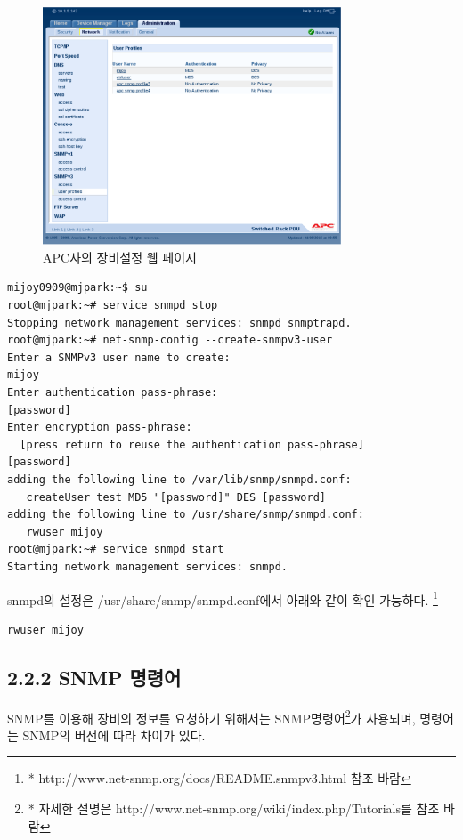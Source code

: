 \documentclass[11pt
  , a4paper
  , article
  , oneside
]{memoir}
\begin{document}
\begin{figure}[h]
  \centering
  \includegraphics[width=0.79\textwidth]{./images/apcv3.eps}
  \caption{APC사의 장비설정 웹 페이지}
  \label{fig:apc_v3}   
\end{figure}




\begin{lstlisting}[style=termstyle]
mijoy0909@mjpark:~$ su                                     
root@mjpark:~# service snmpd stop
Stopping network management services: snmpd snmptrapd.
root@mjpark:~# net-snmp-config --create-snmpv3-user
Enter a SNMPv3 user name to create: 
mijoy
Enter authentication pass-phrase: 
[password]
Enter encryption pass-phrase: 
  [press return to reuse the authentication pass-phrase]
[password]
adding the following line to /var/lib/snmp/snmpd.conf:
   createUser test MD5 "[password]" DES [password]
adding the following line to /usr/share/snmp/snmpd.conf:
   rwuser mijoy 
root@mjpark:~# service snmpd start
Starting network management services: snmpd.
\end{lstlisting}

snmpd의 설정은 /usr/share/snmp/snmpd.conf에서 아래와 같이 확인 가능하다. \footnote{* http://www.net-snmp.org/docs/README.snmpv3.html 참조 바람}

\begin{lstlisting}[style=termstyle]
rwuser mijoy
\end{lstlisting}


\subsection{2.2.2 SNMP 명령어}
SNMP를 이용해 장비의 정보를 요청하기 위해서는 SNMP명령어\footnote{* 자세한 설명은 http://www.net-snmp.org/wiki/index.php/Tutorials를 참조 바람}가 사용되며, 명령어는 SNMP의 버전에 따라 차이가 있다.
\end{document}

